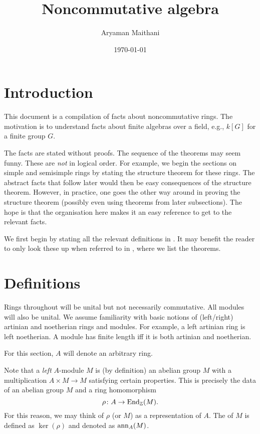 \documentclass[12pt]{article}
\title{Noncommutative algebra}
\author{Aryaman Maithani}
\date{\today}
\begin{document}
\maketitle
\tableofcontents

\part*{Introduction}

This document is a compilation of facts about noncommutative rings. 
The motivation is to understand facts about finite algebras over a field, 
e.g., $k[G]$ for a finite group $G$. 

The facts are stated without proofs. 
The sequence of the theorems may seem funny. 
These are \emph{not} in logical order. 
For example, we begin the sections on simple and semisimple rings by stating the structure theorem for these rings. 
The abstract facts that follow later would then be easy consequences of the structure theorem. 
However, in practice, one goes the other way around in proving the structure theorem (possibly even using theorems from later subsections). 
The hope is that the organisation here makes it an easy reference to get to the relevant facts. 

We first begin by stating all the relevant definitions in . 
It may benefit the reader to only look these up when referred to in , where we list the theorems.

\part{Definitions} \label{part:definitions}

Rings throughout will be unital but not necessarily commutative. 
All modules will also be unital. 
We assume familiarity with basic notions of (left/right) artinian and noetherian rings and modules. 
For example, a left artinian ring is left noetherian. 
A module has finite length iff it is both artinian and noetherian.

For this section, $A$ will denote an arbitrary ring. 

Note that a \emph{left} $A$-module $M$ is (by definition) an abelian group $M$ with a multiplication $A \times M \to M$ satisfying certain properties. 
This is precisely the data of an abelian group $M$ and a ring homomorphism
\begin{equation*} 
	\rho \colon A \to \operatorname{End}_{\mathbb{Z}}(M).
\end{equation*}
For this reason, we may think of $\rho$ (or $M$) as a representation of $A$. 
The  of $M$ is defined as $\ker(\rho)$ and denoted as $\operatorname{ann}_{A}(M)$.
\end{document}
